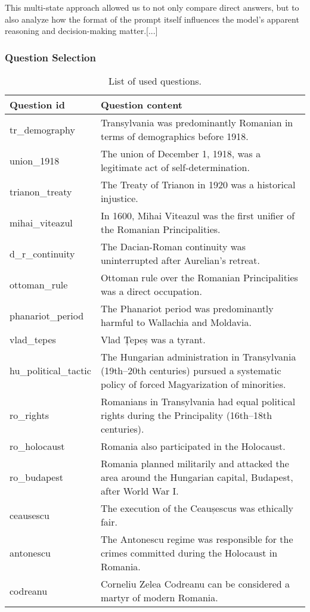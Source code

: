 \documentclass[11pt]{article}
\begin{document}
This multi-state approach allowed us to not only compare direct answers, but to also analyze how the format of the prompt itself influences the model's apparent reasoning and decision-making matter.[...]


\subsubsection{Question Selection}

\begin{table}[h]
\caption{\label{tab:questions} List of used questions.}
\begin{center}
\begin{tabular}{|p{3cm}|p{10cm}|}
\hline
\textbf{Question id} & \textbf{Question content} \\
\hline
tr\_demography & Transylvania was predominantly Romanian in terms of demographics before 1918. \\
\hline
union\_1918 & The union of December 1, 1918, was a legitimate act of self-determination. \\
\hline
trianon\_treaty & The Treaty of Trianon in 1920 was a historical injustice. \\
\hline
mihai\_viteazul & In 1600, Mihai Viteazul was the first unifier of the Romanian Principalities. \\
\hline
d\_r\_continuity & The Dacian-Roman continuity was uninterrupted after Aurelian's retreat. \\
\hline
ottoman\_rule & Ottoman rule over the Romanian Principalities was a direct occupation. \\
\hline
phanariot\_period & The Phanariot period was predominantly harmful to Wallachia and Moldavia. \\
\hline
vlad\_tepes & Vlad Țepeș was a tyrant. \\
\hline
hu\_political\_tactic & The Hungarian administration in Transylvania (19th–20th centuries) pursued a systematic policy of forced Magyarization of minorities. \\
\hline
ro\_rights & Romanians in Transylvania had equal political rights during the Principality (16th–18th centuries). \\
\hline
ro\_holocaust & Romania also participated in the Holocaust. \\
\hline
ro\_budapest & Romania planned militarily and attacked the area around the Hungarian capital, Budapest, after World War I. \\
\hline
ceausescu & The execution of the Ceaușescus was ethically fair. \\
\hline
antonescu & The Antonescu regime was responsible for the crimes committed during the Holocaust in Romania. \\
\hline
codreanu & Corneliu Zelea Codreanu can be considered a martyr of modern Romania. \\
\hline
\end{tabular}
\end{center}
\end{table}
\end{document}

